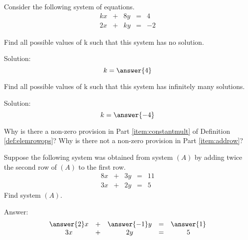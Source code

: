 \documentclass{ximera}
\begin{document}
  \begin{problem}
  Consider the following system of equations.
  $$\begin{array}{ccccc}
      kx & +&8y&= &4 \\
	 2x& +&ky&=&-2
    \end{array}$$
     \begin{problem}
Find all possible values of k such that this system has no solution.

Solution: $$k=\answer{4}$$
  \end{problem}
     \begin{problem}
Find all possible values of k such that this system has infinitely many solutions.

Solution: $$k=\answer{-4}$$
  \end{problem}
  \end{problem}

\begin{problem}
Why is there a non-zero provision in Part \ref{item:constantmult} of Definition \ref{def:elemrowops}?  Why is there not a non-zero provision in Part \ref{item:addrow}?
\end{problem}

\begin{problem}
Suppose the following system was obtained from system $(A)$ by adding twice the second row of $(A)$ to the first row.
$$\begin{array}{ccccc}
      8x &+ &3y&= &11\\
      3x&+ &2y&=&5      
    \end{array}$$
    Find system $(A)$.
    
    Answer:
    $$\begin{array}{ccccc}
      \answer{2}x &+ &\answer{-1}y&= &\answer{1}\\
      3x&+ &2y&=&5      
    \end{array}$$
    
\end{problem}
\end{document}
